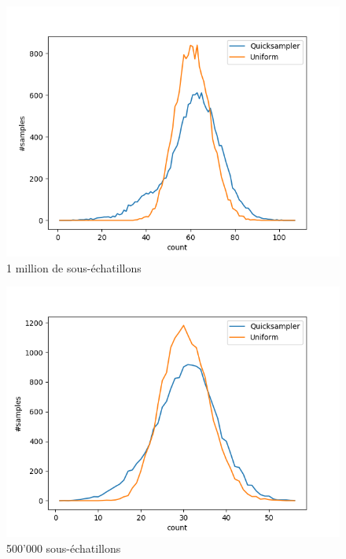 \documentclass{article}
\begin{document}
\begin{figure}[!h]
    \includegraphics[scale=0.7]{DistributionFigures/Figure_case_110_1M.png}
    \caption{1 million de sous-échatillons}
\end{figure}
\begin{figure}[!h]
    \includegraphics[scale=0.7]{DistributionFigures/Figure_case_110_500K.png}
    \caption{500'000 sous-échatillons}
\end{figure}
\end{document}
